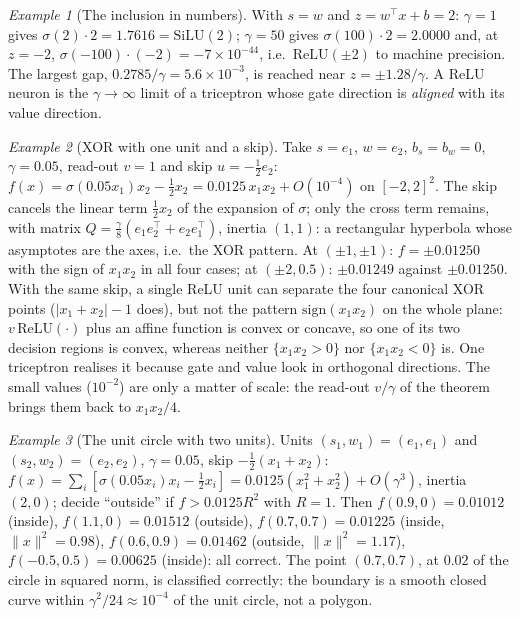 \documentclass[11pt,a4paper]{article}
\theoremstyle{plain}
\theoremstyle{definition}
\theoremstyle{remark}
\newtheorem{example}{Example}
\newcommand{\T}{\top}
\begin{document}
\begin{example}[The inclusion in numbers]
With $s=w$ and $z=w^\T x+b=2$: $\gamma=1$ gives $\sigma(2)\cdot2=1.7616=\mathrm{SiLU}(2)$;
$\gamma=50$ gives $\sigma(100)\cdot2=2.0000$ and, at $z=-2$,
$\sigma(-100)\cdot(-2)=-7\times10^{-44}$, i.e.\ $\mathrm{ReLU}(\pm2)$ to
machine precision. The largest gap, $0.2785/\gamma=5.6\times10^{-3}$, is
reached near $z=\pm1.28/\gamma$. A ReLU neuron is the $\gamma\to\infty$ limit
of a triceptron whose gate direction is \emph{aligned} with its value
direction.
\end{example}

\begin{example}[XOR with one unit and a skip]
Take $s=e_1$, $w=e_2$, $b_s=b_w=0$, $\gamma=0.05$, read-out $v=1$ and skip
$u=-\tfrac12e_2$: $f(x)=\sigma(0.05x_1)x_2-\tfrac12x_2=0.0125\,x_1x_2+O(10^{-4})$
on $[-2,2]^2$. The skip cancels the linear term $\tfrac12x_2$ of the
expansion of $\sigma$; only the cross term remains, with matrix
$Q=\tfrac\gamma8(e_1e_2^\T+e_2e_1^\T)$, inertia $(1,1)$: a rectangular
hyperbola whose asymptotes are the axes, i.e.\ the XOR pattern. At
$(\pm1,\pm1)$: $f=\pm0.01250$ with the sign of $x_1x_2$ in all four cases; at
$(\pm2,0.5)$: $\pm0.01249$ against $\pm0.01250$. With the same skip, a single
ReLU unit can separate the four canonical XOR points ($|x_1+x_2|-1$ does),
but not the pattern $\mathrm{sign}(x_1x_2)$ on the whole plane:
$v\,\mathrm{ReLU}(\cdot)$ plus an affine function is convex or concave, so
one of its two decision regions is convex, whereas neither $\{x_1x_2>0\}$
nor $\{x_1x_2<0\}$ is. One triceptron
realises it because gate and value look in orthogonal directions. The small
values ($10^{-2}$) are only a matter of scale: the read-out $v/\gamma$ of the
theorem brings them back to $x_1x_2/4$.
\end{example}

\begin{example}[The unit circle with two units]
Units $(s_1,w_1)=(e_1,e_1)$ and $(s_2,w_2)=(e_2,e_2)$, $\gamma=0.05$, skip
$-\tfrac12(x_1+x_2)$: $f(x)=\sum_i[\sigma(0.05x_i)x_i-\tfrac12x_i]=0.0125(x_1^2+x_2^2)+O(\gamma^3)$,
inertia $(2,0)$; decide ``outside'' if $f>0.0125R^2$ with $R=1$. Then
$f(0.9,0)=0.01012$ (inside), $f(1.1,0)=0.01512$ (outside),
$f(0.7,0.7)=0.01225$ (inside, $\|x\|^2=0.98$), $f(0.6,0.9)=0.01462$ (outside,
$\|x\|^2=1.17$), $f(-0.5,0.5)=0.00625$ (inside): all correct. The point
$(0.7,0.7)$, at $0.02$ of the circle in squared norm, is classified
correctly: the boundary is a smooth closed curve within
$\gamma^2/24\approx10^{-4}$ of the unit circle, not a polygon.
\end{example}
\end{document}
